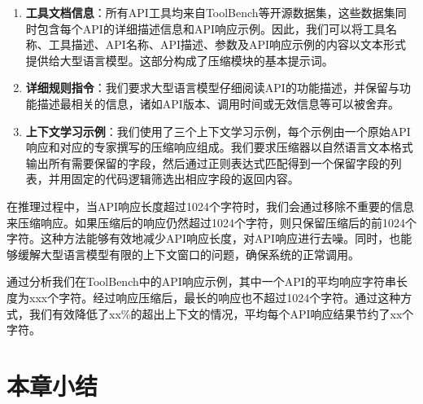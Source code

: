 \begin{enumerate}
    \item \textbf{工具文档信息}：所有API工具均来自ToolBench等开源数据集，这些数据集同时包含每个API的详细描述信息和API响应示例。因此，我们可以将工具名称、工具描述、API名称、API描述、参数及API响应示例的内容以文本形式提供给大型语言模型。这部分构成了压缩模块的基本提示词。
    
    \item \textbf{详细规则指令}：我们要求大型语言模型仔细阅读API的功能描述，并保留与功能描述最相关的信息，诸如API版本、调用时间或无效信息等可以被舍弃。
    
    \item \textbf{上下文学习示例}：我们使用了三个上下文学习示例，每个示例由一个原始API响应和对应的专家撰写的压缩响应组成。我们要求压缩器以自然语言文本格式输出所有需要保留的字段，然后通过正则表达式匹配得到一个保留字段的列表，并用固定的代码逻辑筛选出相应字段的返回内容。
\end{enumerate}

在推理过程中，当API响应长度超过1024个字符时，我们会通过移除不重要的信息来压缩响应。如果压缩后的响应仍然超过1024个字符，则只保留压缩后的前1024个字符。这种方法能够有效地减少API响应长度，对API响应进行去噪。同时，也能够缓解大型语言模型有限的上下文窗口的问题，确保系统的正常调用。

通过分析我们在ToolBench中的API响应示例，其中一个API的平均响应字符串长度为xxx个字符。经过响应压缩后，最长的响应也不超过1024个字符。通过这种方式，我们有效降低了xx\%的超出上下文的情况，平均每个API响应结果节约了xx个字符。


\section{本章小结}
\label{sec:summary_chap4}